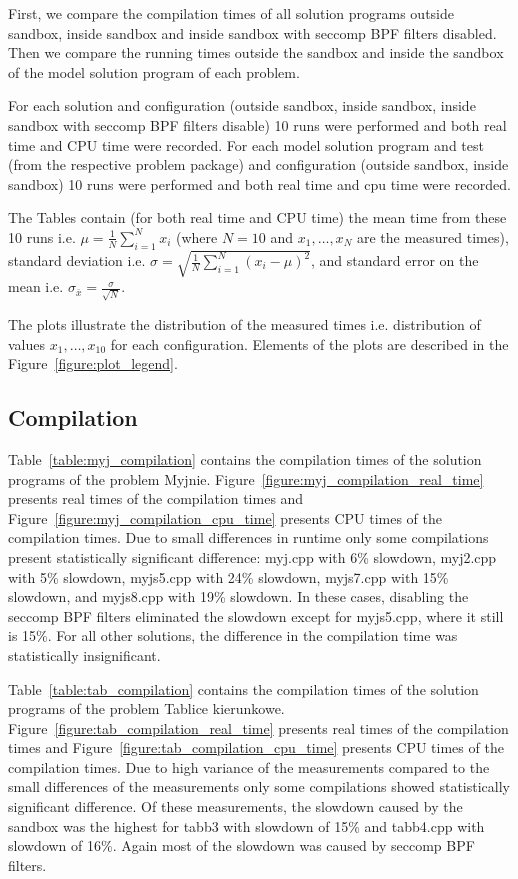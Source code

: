 \documentclass[en]{pracamgr}
\begin{document}
First, we compare the compilation times of all solution programs outside sandbox, inside sandbox and inside sandbox with seccomp BPF filters disabled. Then we compare the running times outside the sandbox and inside the sandbox of the model solution program of each problem.

For each solution and configuration (outside sandbox, inside sandbox, inside sandbox with seccomp BPF filters disable) 10 runs were performed and both real time and CPU time were recorded. For each model solution program and test (from the respective problem package) and configuration (outside sandbox, inside sandbox) 10 runs were performed and both real time and cpu time were recorded.

The Tables contain (for both real time and CPU time) the mean time from these 10 runs i.e. $\mu = \frac{1}{N} \sum_{i=1}^N x_i$ (where $N = 10$ and $x_1, \ldots, x_N$ are the measured times), standard deviation i.e. $\sigma = \sqrt{\frac{1}{N} \sum_{i=1}^N (x_i - \mu)^2}$, and standard error on the mean i.e. $\sigma_{\bar{x}} = \frac{\sigma}{\sqrt{N}}$.

The plots illustrate the distribution of the measured times i.e. distribution of values $x_1, \ldots, x_{10}$ for each configuration. Elements of the plots are described in the Figure~\ref{figure:plot_legend}.

\subsection{Compilation}

Table~\ref{table:myj_compilation} contains the compilation times of the solution programs of the problem Myjnie. Figure~\ref{figure:myj_compilation_real_time} presents real times of the compilation times and Figure~\ref{figure:myj_compilation_cpu_time} presents CPU times of the compilation times. Due to small differences in runtime only some compilations present statistically significant difference: myj.cpp with 6\% slowdown, myj2.cpp with 5\% slowdown, myjs5.cpp with 24\% slowdown, myjs7.cpp with 15\% slowdown, and myjs8.cpp with 19\% slowdown. In these cases, disabling the seccomp BPF filters eliminated the slowdown except for myjs5.cpp, where it still is 15\%. For all other solutions, the difference in the compilation time was statistically insignificant.

Table~\ref{table:tab_compilation} contains the compilation times of the solution programs of the problem Tablice kierunkowe. Figure~\ref{figure:tab_compilation_real_time} presents real times of the compilation times and Figure~\ref{figure:tab_compilation_cpu_time} presents CPU times of the compilation times. Due to high variance of the measurements compared to the small differences of the measurements only some compilations showed statistically significant difference. Of these measurements, the slowdown caused by the sandbox was the highest for tabb3 with slowdown of 15\% and tabb4.cpp with slowdown of 16\%. Again most of the slowdown was caused by seccomp BPF filters.
\end{document}
